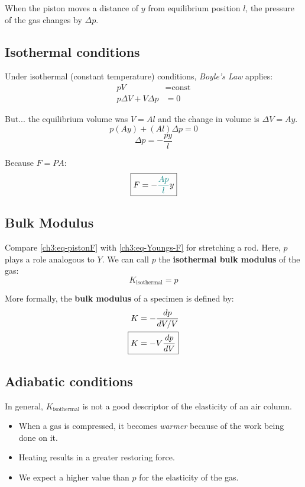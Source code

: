 When the piston moves a distance of $y$ from equilibrium position $l$, the pressure of the gas changes by $\Delta p$.

\subsection{Isothermal conditions}
Under {isothermal} (constant temperature) conditions, \emph{Boyle's Law} applies:
\begin{align*}
pV &= \text{const} \\
p\Delta V + V\Delta p &= 0
\end{align*}

But... the equilibrium volume was $V = Al$ and the change in volume is $\Delta V = Ay$.
\[ p(Ay) + (Al)\Delta p = 0 \]
\[ \Delta p = -\frac{py}{l} \]

Because $F=PA$:
\begin{equation}
	\boxed{F=-\textcolor{teal}{\frac{Ap}{l}} y } \label{ch3:eq-pistonF}
\end{equation}

\subsection{Bulk Modulus} \label{ch3:sec-bulk-modulus}

Compare \eqref{ch3:eq-pistonF} with \eqref{ch3:eq-Youngs-F} for stretching a rod. Here, $p$ plays a role analogous to $Y$. We can call $p$ the \textbf{isothermal bulk modulus} of the gas:
\begin{equation*}
	K_\text{isothermal} = p
\end{equation*}

More formally, the \textbf{bulk modulus} of a specimen is defined by:
\begin{align*}
	K &= -\frac{dp}{dV/V} \notag \\
	\Aboxed{K &= -V\frac{dp}{dV}}
\end{align*}

\subsection{Adiabatic conditions}

In general, $K_\text{isothermal}$ is not a good descriptor of the elasticity of an air column.
\begin{itemize}
	\item When a gas is compressed, it becomes \emph{warmer} because of the work being done on it.
	\item Heating results in a greater restoring force.
	\item We expect a higher value than $p$ for the elasticity of the gas.
\end{itemize}

